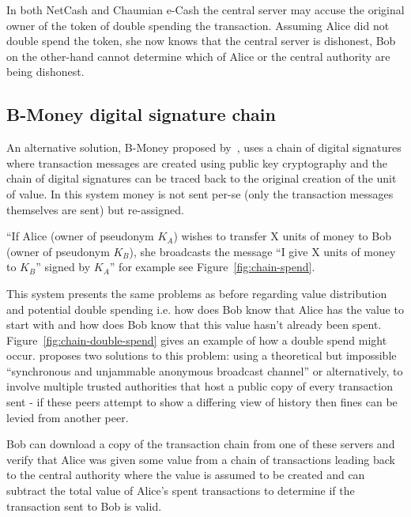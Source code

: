 In both NetCash and Chaumian e-Cash the central server may accuse the original owner of the token of double spending the transaction.  Assuming Alice did not double spend the token, she now knows that the central server is dishonest, Bob on the other-hand cannot determine which of Alice or the central authority are being dishonest.

\subsection{B-Money digital signature chain}\label{digital-sig}
An alternative solution, B-Money proposed by~\textcite{b-money}, uses a chain of digital signatures where transaction messages are created using public key cryptography and the chain of digital signatures can be traced back to the original creation of the unit of value. In this system money is not sent per-se (only the transaction messages themselves are sent) but re-assigned.

``If Alice (owner of pseudonym $K_A$) wishes to transfer X units of money to Bob (owner of pseudonym $K_B$), she broadcasts the message ``I give X units of money to $K_B$'' signed by $K_A$'' for example see Figure~\ref{fig:chain-spend}.

This system presents the same problems as before regarding value distribution and potential double spending i.e. how does Bob know that Alice has the value to start with and how does Bob know that this value hasn't already been spent.  Figure~\ref{fig:chain-double-spend} gives an example of how a double spend might occur. \textcite{b-money} proposes two solutions to this problem: using a theoretical but impossible ``synchronous and unjammable anonymous broadcast channel'' or alternatively, to involve multiple trusted authorities that host a public copy of every transaction sent - if these peers attempt to show a differing view of history then fines can be levied from another peer.

Bob can download a copy of the transaction chain from one of these servers and verify that Alice was given some value from a chain of transactions leading back to the central authority where the value is assumed to be created and can subtract the total value of  Alice's spent transactions to determine if the transaction sent to Bob is valid.

